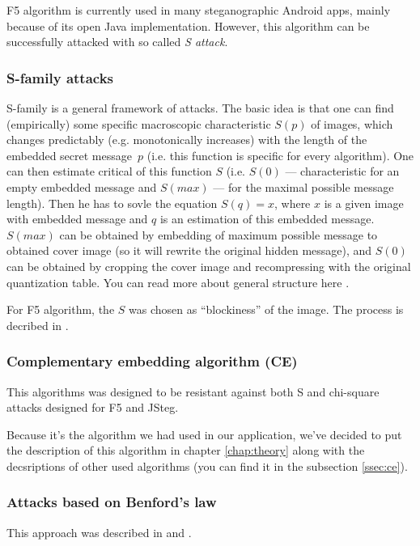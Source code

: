 F5 algorithm is currently used in many steganographic Android apps, mainly because of its open Java implementation. However, this
algorithm can be successfully attacked with so called \emph{S attack}.


\subsubsection{S-family attacks}

S-family is a general framework of attacks. The basic idea is that one can find (empirically) some specific macroscopic 
characteristic $S(p)$ of images, which changes predictably (e.g. monotonically increases) 
with the length of the embedded secret message~$p$ (i.e. this function is specific for every algorithm). 
One can then estimate critical of this function $S$ (i.e. $S(0)$ --- characteristic for an empty embedded message and
$S(max)$ --- for the maximal possible message length). Then he has to sovle the equation $S(q) = x$, where $x$ is a given
image with embedded message and $q$ is an estimation of this embedded message. $S(max)$ can be obtained by embedding of
maximum possible message to obtained cover image (so it will rewrite the original hidden message), and $S(0)$ can be obtained
by cropping the cover image and recompressing with the original quantization table. You can read more about general structure
here \cite{fridrich2002attacking}.

For F5 algorithm, the $S$ was chosen as ``blockiness'' of the image. The process is decribed in \cite{fridrich2002steganalysis}.

\subsubsection{Complementary embedding algorithm (CE)}

This algorithms was designed to be resistant against both S and chi-square attacks designed for F5 and JSteg.

Because it's the algorithm we had used in our application, 
we've decided to put the description of this algorithm in chapter \ref{chap:theory}
along with the decsriptions of other used algorithms (you can find it in the subsection
\ref{ssec:ce}).

\subsubsection{Attacks based on Benford's law}

This approach was described in \cite{andriotis2013two} and \cite{andriotis2013jpeg}.

